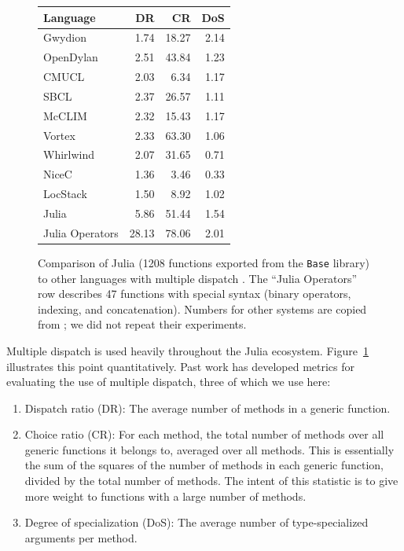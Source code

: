 \documentclass[preprint]{sigplanconf}
\newcommand{\code}[1]{\texttt{#1}}
\begin{document}
\begin{figure}
\label{dispatchratios}
\begin{center}
\begin{tabular}{|l|r|r|r|}\hline
Language & DR & CR & DoS \\
\hline \hline
Gwydion    & 1.74 & 18.27 & 2.14 \\
\hline
OpenDylan  & 2.51 & 43.84 & 1.23 \\
\hline
CMUCL      & 2.03 &  6.34 & 1.17 \\
\hline
SBCL       & 2.37 & 26.57 & 1.11 \\
\hline
McCLIM     & 2.32 & 15.43 & 1.17 \\
\hline
Vortex     & 2.33 & 63.30 & 1.06 \\
\hline
Whirlwind  & 2.07 & 31.65 & 0.71 \\
\hline
NiceC      & 1.36 &  3.46 & 0.33 \\
\hline
LocStack   & 1.50 &  8.92 & 1.02 \\
\hline
Julia      & 5.86 & 51.44 & 1.54 \\
\hline
Julia Operators & 28.13 & 78.06 & 2.01 \\
\hline
\end{tabular}
\end{center}
\caption{
Comparison of Julia (1208 functions exported from the \code{Base} library)
to other languages with multiple dispatch \cite{Muschevici:2008}.
The ``Julia Operators'' row describes 47 functions with special syntax
(binary operators, indexing, and concatenation).
Numbers for other systems are copied from \cite{Muschevici:2008}; we did
not repeat their experiments.
}
\end{figure}

Multiple dispatch is used heavily throughout the Julia ecosystem.
Figure~\ref{dispatchratios} illustrates this point quantitatively.
Past work \cite{Muschevici:2008} has developed metrics for evaluating the use
of multiple dispatch, three of which we use here:

\begin{enumerate}
\item Dispatch ratio (DR): The average number of methods in a generic function.
\item Choice ratio (CR): For each method, the total number of methods over all
generic functions it belongs to, averaged over all methods. This is essentially
the sum of the squares of the number of methods in each generic function, divided
by the total number of methods. The intent of this statistic is to give more weight
to functions with a large number of methods.
\item Degree of specialization (DoS): The average number of type-specialized
arguments per method.
\end{enumerate}
\end{document}

